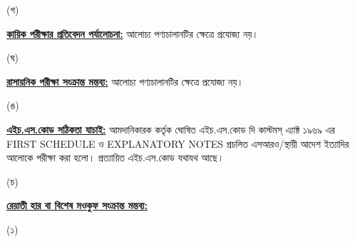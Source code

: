 \documentclass[12pt]{article}
\begin{document}
\begin{minipage}[t]{0.05\linewidth}
\hspace{1em}
\end{minipage}
\begin{minipage}[t]{0.05\linewidth}
(গ)
\end{minipage}
\begin{minipage}[t]{0.90\linewidth}
\underline{\textbf{কায়িক পরীক্ষার প্রতিবেদন পর্যালোচনা:}}
আলোচ্য পণ্যচালানটির ক্ষেত্রে প্রযোজ্য নয়।
\end{minipage}
\begin{minipage}[t]{0.05\linewidth}
\hspace{1em}
\end{minipage}
\begin{minipage}[t]{0.05\linewidth}
(ঘ)
\end{minipage}
\begin{minipage}[t]{0.90\linewidth}
\underline{\textbf{রাসায়নিক পরীক্ষা সংক্রান্ত মন্তব্য:}}
আলোচ্য পণ্যচালানটির ক্ষেত্রে প্রযোজ্য নয়।
\\
\end{minipage}
\begin{minipage}[t]{0.05\linewidth}
\hspace{1em}
\end{minipage}
\begin{minipage}[t]{0.05\linewidth}
(ঙ)
\end{minipage}
\begin{minipage}[t]{0.90\linewidth}
\underline{\textbf{এইচ.এস.কোড সঠিকতা যাচাই:}}
আমদানিকারক কর্তৃক ঘোষিত এইচ.এস.কোড দি কাস্টমস্ এ্যাক্ট ১৯৬৯ এর FIRST SCHEDULE ও
EXPLANATORY NOTES প্রচলিত এসআরও/স্থায়ী আদেশ ইত্যাদির আলোকে পরীক্ষা করা হলো।
প্রত্যায়িত এইচ.এস.কোড যথাযথ আছে।
\\
\end{minipage}
\begin{minipage}[t]{0.05\linewidth}
\hspace{1em}
\end{minipage}
\begin{minipage}[t]{0.05\linewidth}
(চ)
\end{minipage}
\begin{minipage}[t]{0.90\linewidth}
\underline{\textbf{রেয়াতী হার বা বিশেষ মওকুফ সংক্রান্ত মন্তব্য:}}
\end{minipage}
\begin{minipage}[t]{0.1\linewidth}
\hspace{1em}
\end{minipage}
\begin{minipage}[t]{0.05\linewidth}
(১)
\end{minipage}
\end{document}
